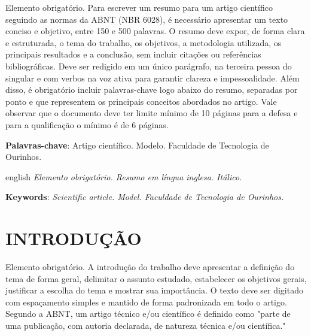 \documentclass[
	article,
	12pt,
	oneside,
	a4paper,
	english,
	brazil,
	sumario=tradicional
]{abntex2}
\begin{document}

\frenchspacing

\maketitle

\begin{resumoumacoluna}
Elemento obrigatório. Para escrever um resumo para um artigo científico seguindo as normas da ABNT (NBR 6028), é necessário apresentar um texto conciso e objetivo, entre 150 e 500 palavras. O resumo deve expor, de forma clara e estruturada, o tema do trabalho, os objetivos, a metodologia utilizada, os principais resultados e a conclusão, sem incluir citações ou referências bibliográficas. Deve ser redigido em um único parágrafo, na terceira pessoa do singular e com verbos na voz ativa para garantir clareza e impessoalidade. Além disso, é obrigatório incluir palavras-chave logo abaixo do resumo, separadas por ponto e que representem os principais conceitos abordados no artigo. Vale observar que o documento deve ter limite mínimo de 10 páginas para a defesa e para a qualificação o mínimo é de 6 páginas.

\vspace{\onelineskip}

\noindent
\textbf{Palavras-chave}: Artigo científico. Modelo. Faculdade de Tecnologia de Ourinhos.
\end{resumoumacoluna}

\renewcommand{\resumoname}{ABSTRACT}
\begin{resumoumacoluna}
	\begin{otherlanguage*}{english}
		\textit{Elemento obrigatório. Resumo em língua inglesa. Itálico.}
		\vspace{\onelineskip}

		\noindent
		\textbf{Keywords}: \textit{Scientific article. Model. Faculdade de Tecnologia de Ourinhos.}
	\end{otherlanguage*}  
\end{resumoumacoluna}

\textual

\section{\textbf{INTRODUÇÃO}}

Elemento obrigatório. A introdução do trabalho deve apresentar a definição do tema de forma geral, delimitar o assunto estudado, estabelecer os objetivos gerais, justificar a escolha do tema e mostrar sua importância. O texto deve ser digitado com espaçamento simples e mantido de forma padronizada em todo o artigo. Segundo a ABNT, um artigo técnico e/ou científico é definido como "parte de uma publicação, com autoria declarada, de natureza técnica e/ou científica." \cite{NBR6022:2018}
\end{document}
